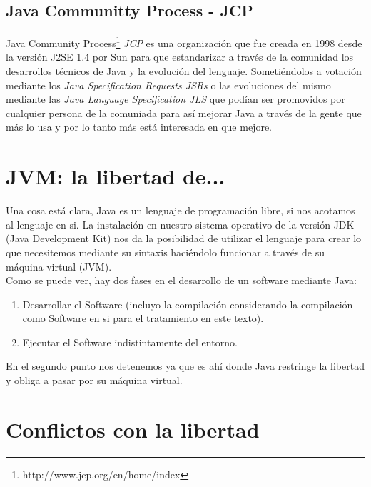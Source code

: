 \documentclass[11pt]{scrartcl}
\begin{document}
\subsection{Java Communitty Process - JCP}

Java Community Process\footnote{http://www.jcp.org/en/home/index} \emph{JCP} es una organización que fue creada en 1998 desde la versión J2SE 1.4 por Sun para que estandarizar a través de la comunidad los desarrollos técnicos de Java y la evolución del lenguaje. Sometiéndolos a votación mediante los \emph{Java Specification Requests JSRs} o las evoluciones del mismo mediante las \emph{Java Language Specification JLS} que podían ser promovidos por cualquier persona de la comuniada para así mejorar Java a través de la gente que más lo usa y por lo tanto más está interesada en que mejore. 

\section{JVM: la libertad de...}

Una cosa está clara, Java es un lenguaje de programación libre, si nos acotamos al lenguaje en si. La instalación en nuestro sistema operativo de la versión JDK (Java Development Kit) nos da la posibilidad de utilizar el lenguaje para crear lo que necesitemos mediante su sintaxis haciéndolo funcionar a través de su máquina virtual (JVM).\\
Como se puede ver, hay dos fases en el desarrollo de un software mediante Java:
\begin{enumerate}
\item Desarrollar el Software (incluyo la compilación considerando la compilación como Software en si para el tratamiento en este texto).
\item Ejecutar el Software indistintamente del entorno.
\end{enumerate}

En el segundo punto nos detenemos ya que es ahí donde Java restringe la libertad y obliga a pasar por su máquina virtual.

\section{Conflictos con la libertad}
\end{document}
